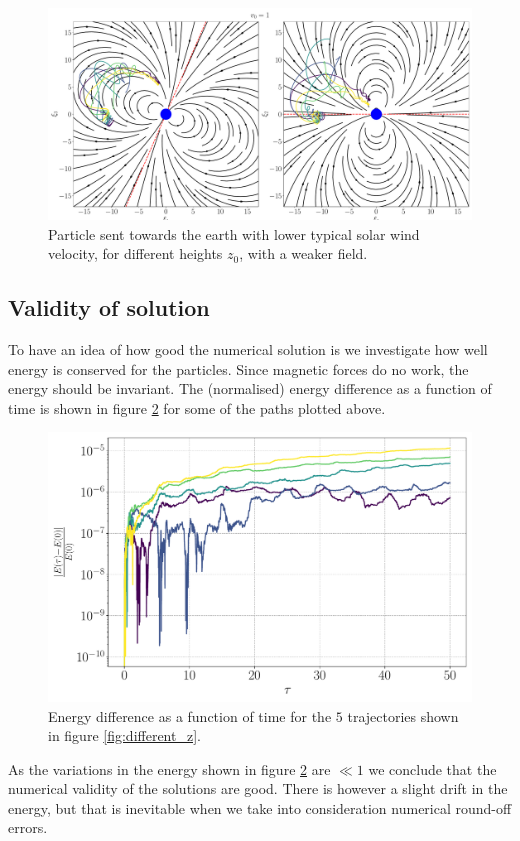 \begin{figure}[htb]
	\centering
	\includegraphics[width=\columnwidth]{../fig/weak_traj_diffz.pdf}
	\caption{Particle sent towards the earth with lower typical solar wind velocity, for different heights $z_0$, with a weaker field.}
	\label{fig:weak_different_z}
\end{figure}

\subsection{Validity of solution}

To have an idea of how good the numerical solution is we investigate how well energy is conserved for the particles. Since magnetic forces do no work, the energy should be invariant. The (normalised) energy difference as a function of time is shown in figure \ref{fig:energy} for some of the paths plotted above.

\begin{figure}[htb]
	\centering
	\includegraphics[width=0.8\columnwidth]{../fig/energy.pdf}
	\caption{Energy difference as a function of time for the $5$ trajectories shown in figure \ref{fig:different_z}.}
	\label{fig:energy}
\end{figure}

As the variations in the energy shown in figure \ref{fig:energy} are $\ll 1$ we conclude that the numerical validity of the solutions are good. There is however a slight drift in the energy, but that is inevitable when we take into consideration numerical round-off errors. 
 